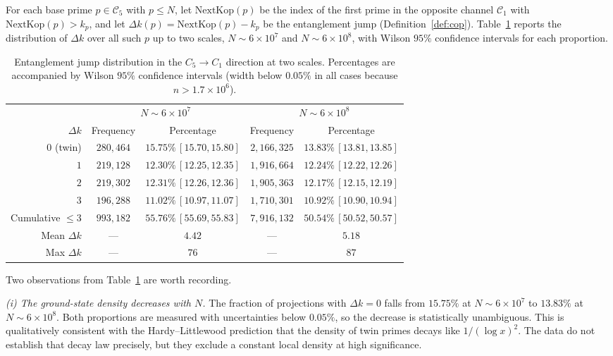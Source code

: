 \documentclass[11pt]{amsart}
\numberwithin{equation}{section}
\newcommand{\Cone}{\mathcal{C}_1}
\newcommand{\Cfive}{\mathcal{C}_5}
\newcommand{\NextKop}{\mathrm{NextKop}}
\theoremstyle{plain}
\theoremstyle{definition}
\begin{document}
For each base prime $p\in\Cfive$ with $p\le N$, let
$\NextKop(p)$ be the index of the first prime in the opposite channel
$\Cone$ with $\NextKop(p)>k_p$, and let
$\Delta k(p)=\NextKop(p)-k_p$ be the entanglement jump
(Definition~\ref{def:cop}). Table~\ref{tab:delta-k} reports the
distribution of $\Delta k$ over all such $p$ up to two scales,
$N\sim 6\times 10^7$ and $N\sim 6\times 10^8$, with Wilson $95\%$
confidence intervals for each proportion.

\begin{table}[htbp]
\centering
\small
\caption{Entanglement jump distribution in the $C_5\to C_1$ direction
at two scales. Percentages are accompanied by Wilson $95\%$ confidence
intervals (width below $0.05\%$ in all cases because
$n>1.7\times 10^6$).}
\label{tab:delta-k}
\begin{tabular}{rcc|cc}
\toprule
& \multicolumn{2}{c|}{$N\sim 6\times 10^7$} & \multicolumn{2}{c}{$N\sim 6\times 10^8$} \\
$\Delta k$ & Frequency & Percentage & Frequency & Percentage \\
\midrule
$0$ (twin) & $280{,}464$ & $15.75\%\,[15.70,15.80]$ & $2{,}166{,}325$ & $13.83\%\,[13.81,13.85]$ \\
$1$ & $219{,}128$ & $12.30\%\,[12.25,12.35]$ & $1{,}916{,}664$ & $12.24\%\,[12.22,12.26]$ \\
$2$ & $219{,}302$ & $12.31\%\,[12.26,12.36]$ & $1{,}905{,}363$ & $12.17\%\,[12.15,12.19]$ \\
$3$ & $196{,}288$ & $11.02\%\,[10.97,11.07]$ & $1{,}710{,}301$ & $10.92\%\,[10.90,10.94]$ \\
\midrule
Cumulative $\le 3$ & $993{,}182$ & $55.76\%\,[55.69,55.83]$ & $7{,}916{,}132$ & $50.54\%\,[50.52,50.57]$ \\
Mean $\Delta k$ & --- & $4.42$ & --- & $5.18$ \\
Max $\Delta k$ & --- & $76$ & --- & $87$ \\
\bottomrule
\end{tabular}
\end{table}

Two observations from Table~\ref{tab:delta-k} are worth recording.

\emph{(i) The ground-state density decreases with $N$.} The fraction
of projections with $\Delta k=0$ falls from $15.75\%$ at
$N\sim 6\times 10^7$ to $13.83\%$ at $N\sim 6\times 10^8$. Both
proportions are measured with uncertainties below $0.05\%$, so the
decrease is statistically unambiguous. This is qualitatively
consistent with the Hardy--Littlewood prediction that the density of
twin primes decays like $1/(\log x)^2$. The data do not establish
that decay law precisely, but they exclude a constant local density
at high significance.
\end{document}
